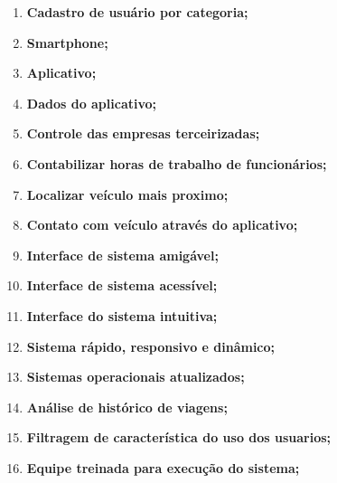\begin{enumerate}

      \item \textbf{Cadastro de usuário por categoria;}



      \item \textbf{Smartphone;}



      \item \textbf{Aplicativo;}



      \item \textbf{Dados do aplicativo;}



      \item \textbf{Controle das empresas terceirizadas;}


      \item \textbf{Contabilizar horas de trabalho de funcionários;}


      \item \textbf{Localizar veículo mais proximo;}


      \item \textbf{Contato com veículo através do aplicativo;}
      \item \textbf{Interface de sistema amigável;}
      \item \textbf{Interface de sistema acessível;}
      \item \textbf{Interface do sistema intuitiva;}
      \item \textbf{Sistema rápido, responsivo e dinâmico;}
      \item \textbf{Sistemas operacionais atualizados;}
      \item \textbf{Análise de histórico de viagens;}
      \item \textbf{Filtragem de característica do uso dos usuarios;}
      \item \textbf{Equipe treinada para execução do sistema;}


\end{enumerate}

